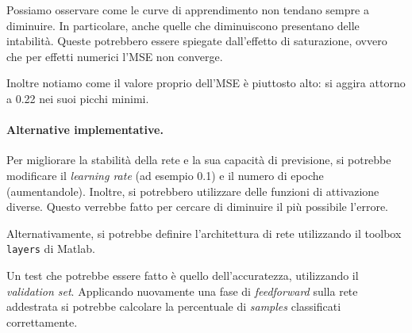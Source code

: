 \documentclass[a4paper,12pt]{article}
\begin{document}
Possiamo osservare come le curve di apprendimento non tendano sempre a diminuire. In particolare, anche quelle che diminuiscono presentano delle intabilità. Queste potrebbero essere spiegate dall'effetto di saturazione, ovvero che per effetti numerici l'MSE non converge. 

Inoltre notiamo come il valore proprio dell'MSE è piuttosto alto: si aggira attorno a 0.22 nei suoi picchi minimi.

\paragraph{Alternative implementative.} Per migliorare la stabilità della rete e la sua capacità di previsione, si potrebbe modificare il \emph{learning rate} (ad esempio 0.1) e il numero di epoche (aumentandole). Inoltre, si potrebbero utilizzare delle funzioni di attivazione diverse. Questo verrebbe fatto per cercare di diminuire il più possibile l'errore. 

Alternativamente, si potrebbe definire l'architettura di rete utilizzando il toolbox \texttt{layers} di Matlab.

Un test che potrebbe essere fatto è quello dell'accuratezza, utilizzando il \emph{validation set}. Applicando nuovamente una fase di \emph{feedforward} sulla rete addestrata si potrebbe calcolare la percentuale di \emph{samples} classificati correttamente.
\end{document}
